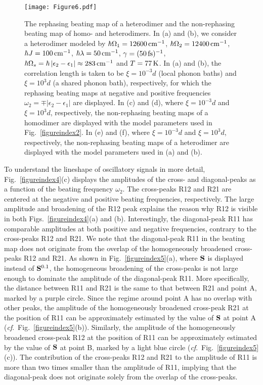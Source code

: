 \documentclass[%
 reprint,%
 amssymb, amsmath,%
 aip,cha,%
]{revtex4-1}
\newcommand{\abs}[1]{\left|#1\right|}
\begin{document}
\begin{figure*}
	\texttt{[image: Figure6.pdf]}
	\caption{The rephasing beating map of a heterodimer and the non-rephasing beating map of homo- and heterodimers. In (a) and (b), we consider a heterodimer modeled by $\hbar\Omega_1=12600\,{\rm cm}^{-1}$, $\hbar\Omega_2=12400\,{\rm cm}^{-1}$, $\hbar J=100\,{\rm cm}^{-1}$, $\hbar\lambda=50\,{\rm cm}^{-1}$, $\gamma=(50\,{\rm fs})^{-1}$, $\hbar\Omega_s=\hbar\abs{\epsilon_2-\epsilon_1}\approx 283\,{\rm cm}^{-1}$ and $T=77\,{\rm K}$. In (a) and (b), the correlation length is taken to be $\xi=10^{-3}d$ (local phonon baths) and $\xi=10^{3}d$ (a shared phonon bath), respectively, for which the rephasing beating maps at negative and positive frequencies $\omega_2=\mp\abs{\epsilon_2-\epsilon_1}$ are displayed. In (c) and (d), where $\xi=10^{-3}d$ and $\xi=10^{3}d$, respectively, the non-rephasing beating maps of a homodimer are displayed with the model parameters used in Fig.~\ref{figureindex2}. In (e) and (f), where $\xi=10^{-3}d$ and $\xi=10^{3}d$, respectively, the non-rephasing beating maps of a heterodimer are displayed with the model parameters used in (a) and (b).}
	\label{figureindex6}
\end{figure*}

To understand the lineshape of oscillatory signals in more detail, Fig.~\ref{figureindex4}(c) displays the amplitudes of the cross- and diagonal-peaks as a function of the beating frequency $\omega_2$. The cross-peaks R12 and R21 are centered at the negative and positive beating frequencies, respectively. The large amplitude and broadening of the R12 peak explains the reason why R12 is visible in both Figs.~\ref{figureindex4}(a) and (b). Interestingly, the diagonal-peak R11 has comparable amplitudes at both positive and negative frequencies, contrary to the cross-peaks R12 and R21. We note that the diagonal-peak R11 in the beating map does not originate from the overlap of the homogeneously broadened cross-peaks R12 and R21. As shown in Fig.~\ref{figureindex5}(a), where ${\bf S}$ is displayed instead of ${\bf S}^{0.1}$, the homogeneous broadening of the cross-peaks is not large enough to dominate the amplitude of the diagonal-peak R11. More specifically, the distance between R11 and R21 is the same to that between R21 and point A, marked by a purple circle. Since the regime around point A has no overlap with other peaks, the amplitude of the homogeneously broadened cross-peak R21 at the position of R11 can be approximately estimated by the value of ${\bf S}$ at point A ({\it cf}.~Fig.~\ref{figureindex5}(b)). Similarly, the amplitude of the homogeneously broadened cross-peak R12 at the position of R11 can be approximately estimated by the value of ${\bf S}$ at point B, marked by a light blue circle ({\it cf}.~Fig.~\ref{figureindex5}(c)). The contribution of the cross-peaks R12 and R21 to the amplitude of R11 is more than two times smaller than the amplitude of R11, implying that the diagonal-peak does not originate solely from the overlap of the cross-peaks.
\end{document}
